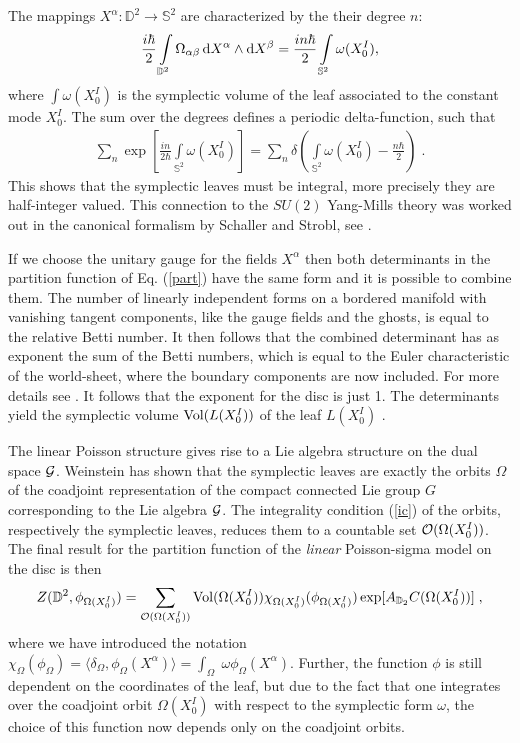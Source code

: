 \documentclass[a4paper,twoside,11pt]{article}
\numberwithin{equation}{section}
\begin{document}
The mappings $X^\alpha:\mathbb{D}^2\rightarrow\mathbb{S}^2$ are characterized by the their degree $n$:
\begin{gather}
\frac{i\hbar}{2}\int\limits_{\mathbb{D}^2}\Omega_{\alpha\beta}\,{\rm d}X^\alpha\wedge{\rm d}X^\beta=
\frac{in\hbar}{2}\int\limits_{\mathbb{S}^2}\omega(X^I_0),
\end{gather}
where $\int \omega(X_0^I)$ is the symplectic volume of the leaf associated to the constant mode $X_0^I$. The sum over the degrees defines a periodic delta-function, such that
\begin{gather}
\sum_n\exp[\frac{in}{2\hbar}\int\limits_{\mathbb{S}^2}\omega(X^I_0)]=\sum_n\delta(\int\limits_{\mathbb{S}^2}
\omega(X^I_0)-\frac{n\hbar}{2})\;.\label{ic}
\end{gather}
This shows that the symplectic leaves must be integral, more precisely 
they are half-integer valued. This connection to the $SU(2)$ Yang-Mills theory was worked out in the canonical formalism by Schaller and Strobl, see \cite{SS}.

If we choose the unitary gauge for the fields $X^\alpha$ then both determinants in the partition function of Eq. (\ref{part}) have 
the same form and it is possible 
to combine them. The number of linearly independent forms on a bordered manifold with 
vanishing tangent components, like the gauge fields and the ghosts, is equal to the relative Betti 
number. It then follows that the combined determinant has as exponent the sum of the Betti numbers, which 
is equal to the Euler characteristic of the world-sheet, where the boundary components are now included. For more 
details see \cite{F}. It follows that the exponent for the disc is just 1. The determinants yield the 
symplectic volume $\text{Vol}(L(X^I_0))$ of the leaf $L(X^I_0)$ \cite{HS}.

The linear Poisson structure gives rise to a Lie algebra structure on the dual space $\mathcal{G}$. Weinstein \cite{WE} 
has shown that the symplectic leaves are exactly the orbits $\Omega$ of the coadjoint representation of 
the compact connected Lie group $G$ corresponding to the Lie algebra $\mathcal{G}$. The integrality condition (\ref{ic}) of 
the orbits, respectively the symplectic leaves, reduces them to a countable set $\mathcal{O}(\Omega(X^I_0))$. 
The final result for the partition function of the {\it linear} Poisson-sigma model on the disc is then
\begin{gather}
Z(\mathbb{D}^2,\phi_{\Omega(X^I_0)})=\sum_{\mathcal{O}(\Omega(X^I_0))}{\rm Vol}(\Omega(X^I_0))
\chi_{\Omega(X^I_0)}(\phi_{\Omega(X^I_0)})
\exp[A_{\mathbb{D}_2}C(\Omega(X^I_0))]\;,
\label{pf}\end{gather}
where we have introduced the notation $\chi_{\Omega}(\phi_\Omega)=\langle\delta_\Omega,\phi_\Omega(X^\alpha)
\rangle=\int_\Omega\;\omega\phi_\Omega(X^\alpha)$.
 Further, the function $\phi$ is still dependent on the coordinates of the leaf, but due to the fact that one integrates over 
the coadjoint orbit $\Omega(X^I_0)$ with respect to the symplectic form $\omega$, the choice of this
function now depends only on the coadjoint orbits. 
\end{document}
